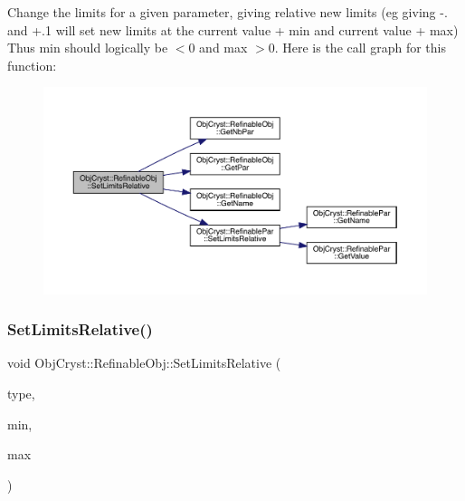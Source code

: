 Change the limits for a given parameter, giving relative new limits (eg giving -\/. and +.1 will set new limits at the current value + min and current value + max) Thus min should logically be $<$0 and max $>$0. Here is the call graph for this function\+:
\nopagebreak
\begin{figure}[H]
\begin{center}
\leavevmode
\includegraphics[width=350pt]{class_obj_cryst_1_1_refinable_obj_acacf469614253239fdeebb21e50f0c1c_cgraph}
\end{center}
\end{figure}
\mbox{\label{class_obj_cryst_1_1_refinable_obj_ae8d497fc43ac3f166a21781a62dfa25d}} 
\subsubsection{\texorpdfstring{SetLimitsRelative()}{SetLimitsRelative()}\hspace{0.1cm}{\footnotesize\ttfamily [2/2]}}
{\footnotesize\ttfamily void Obj\+Cryst\+::\+Refinable\+Obj\+::\+Set\+Limits\+Relative (\begin{DoxyParamCaption}\item[{const \mbox{\hyperlink{class_obj_cryst_1_1_ref_par_type}{Ref\+Par\+Type}} $\ast$}]{type,  }\item[{const R\+E\+AL}]{min,  }\item[{const R\+E\+AL}]{max }\end{DoxyParamCaption})}

